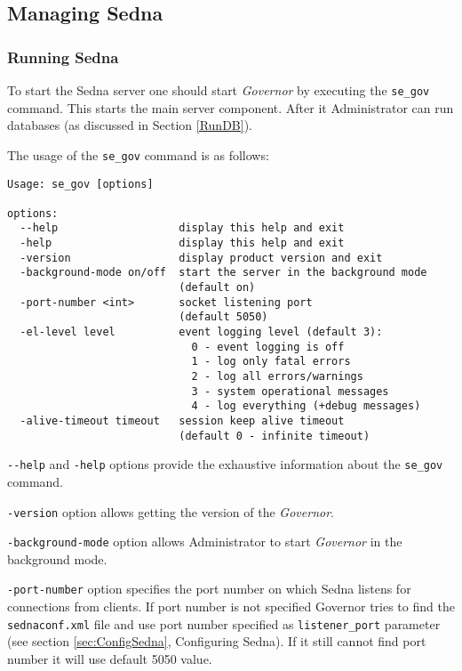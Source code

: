\documentclass[a4paper,12pt]{article}
\begin{document}
\subsection{Managing Sedna}
\subsubsection{Running Sedna}
\label{StartSedna}

To start the Sedna server one should start \emph{Governor} by executing the \verb!se_gov! command. This starts the main server component. After it Administrator can run databases (as discussed in Section \ref{RunDB}).


The usage of the \verb!se_gov! command is as follows:

\begin{verbatim}
Usage: se_gov [options]

options:
  --help                   display this help and exit
  -help                    display this help and exit
  -version                 display product version and exit
  -background-mode on/off  start the server in the background mode
                           (default on)
  -port-number <int>       socket listening port
                           (default 5050)
  -el-level level          event logging level (default 3):
                             0 - event logging is off
                             1 - log only fatal errors
                             2 - log all errors/warnings
                             3 - system operational messages
                             4 - log everything (+debug messages)
  -alive-timeout timeout   session keep alive timeout
                           (default 0 - infinite timeout)
\end{verbatim}

\verb!--help! and \verb!-help! options provide the exhaustive information about the \verb!se_gov! command.

\verb!-version! option allows getting the version of the \emph{Governor}.

\verb!-background-mode! option allows Administrator to start \emph{Governor} in the background mode.

\verb!-port-number! option specifies the port number on which Sedna listens for connections from clients.
If port number is not specified Governor tries to find the \verb!sednaconf.xml! file and use port number specified as \verb!listener_port! parameter (see section \ref{sec:ConfigSedna}, Configuring Sedna).
If it still cannot find port number it will use default 5050 value.
\end{document}

